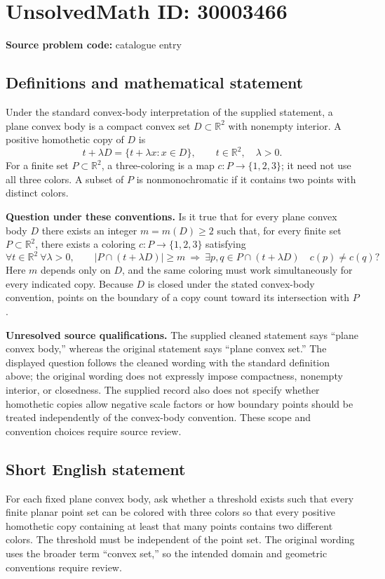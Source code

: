 \documentclass[11pt]{article}
\newcommand{\R}{\mathbb{R}}
\begin{document}
\section*{UnsolvedMath ID: 30003466}
\textbf{Source problem code:} catalogue entry
\subsection{Definitions and mathematical statement}
Under the standard convex-body interpretation of the supplied statement, a plane convex body is a compact convex set \(D\subset\R^2\) with nonempty interior. A positive homothetic copy of \(D\) is
\[
t+\lambda D=\{t+\lambda x:x\in D\},\qquad t\in\R^2,\quad\lambda>0.
\]
For a finite set \(P\subset\R^2\), a three-coloring is a map \(c:P\to\{1,2,3\}\); it need not use all three colors. A subset of \(P\) is nonmonochromatic if it contains two points with distinct colors.

\textbf{Question under these conventions.} Is it true that for every plane convex body \(D\) there exists an integer \(m=m(D)\ge2\) such that, for every finite set \(P\subset\R^2\), there exists a coloring \(c:P\to\{1,2,3\}\) satisfying
\[
\forall t\in\R^2\ \forall\lambda>0,\qquad
\bigl|P\cap(t+\lambda D)\bigr|\ge m
\ \Longrightarrow\
\exists p,q\in P\cap(t+\lambda D)\quad c(p)\ne c(q)?
\]
Here \(m\) depends only on \(D\), and the same coloring must work simultaneously for every indicated copy. Because \(D\) is closed under the stated convex-body convention, points on the boundary of a copy count toward its intersection with \(P\).

\textbf{Unresolved source qualifications.} The supplied cleaned statement says ``plane convex body,'' whereas the original statement says ``plane convex set.'' The displayed question follows the cleaned wording with the standard definition above; the original wording does not expressly impose compactness, nonempty interior, or closedness. The supplied record also does not specify whether homothetic copies allow negative scale factors or how boundary points should be treated independently of the convex-body convention. These scope and convention choices require source review.
\subsection{Short English statement}
For each fixed plane convex body, ask whether a threshold exists such that every finite planar point set can be colored with three colors so that every positive homothetic copy containing at least that many points contains two different colors. The threshold must be independent of the point set. The original wording uses the broader term ``convex set,'' so the intended domain and geometric conventions require review.
\end{document}
